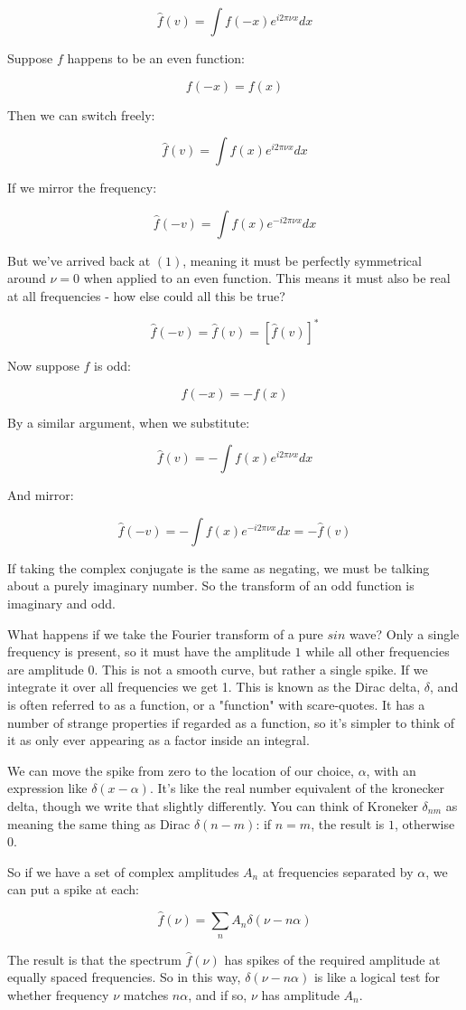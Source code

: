 $$\hat{f}(v) = \int f(-x)e^{i2\pi\nu x} dx$$

Suppose $f$ happens to be an even function:

$$f(-x) = f(x)$$

Then we can switch freely:

$$\hat{f}(v) = \int f(x)e^{i2\pi\nu x} dx$$

If we mirror the frequency:

$$\hat{f}(-v) = \int f(x)e^{-i2\pi\nu x} dx$$

But we've arrived back at $(1)$, meaning it must be perfectly symmetrical around $\nu = 0$ when applied to an even function. This means it must also be real at all frequencies - how else could all this be true?

$$
\hat{f}(-v) = \hat{f}(v) = \left[ \hat{f}(v) \right]^*
$$

Now suppose $f$ is odd:

$$f(-x) = -f(x)$$

By a similar argument, when we substitute:

$$
\hat{f}(v) = - \int f(x)e^{i2\pi\nu x}
dx
$$

And mirror:

$$
\hat{f}(-v) = - \int f(x)e^{-i2\pi\nu x}
dx
= -\hat{f}(v)
$$

If taking the complex conjugate is the same as negating, we must be talking about a purely imaginary number. So the transform of an odd function is imaginary and odd.

What happens if we take the Fourier transform of a pure $sin$ wave? Only a single frequency is present, so it must have the amplitude $1$ while all other frequencies are amplitude $0$. This is not a smooth curve, but rather a single spike. If we integrate it over all frequencies we get 1. This is known as the Dirac delta, $\delta$, and is often referred to as a function, or a "function" with scare-quotes. It has a number of strange properties if regarded as a function, so it's simpler to think of it as only ever appearing as a factor inside an integral.

We can move the spike from zero to the location of our choice, $\alpha$, with an expression like $\delta(x - \alpha)$. It's like the real number equivalent of the kronecker delta, though we write that slightly differently. You can think of Kroneker $\delta_{nm}$ as meaning the same thing as Dirac $\delta(n - m)$: if $n = m$, the result is $1$, otherwise $0$.

So if we have a set of complex amplitudes $A_n$ at frequencies separated by $\alpha$, we can put a spike at each:

$$
\hat{f}(\nu) =
\sum_n A_n \delta(\nu - n\alpha)
$$

The result is that the spectrum $\hat{f}(\nu)$ has spikes of the required amplitude at equally spaced frequencies. So in this way, $\delta(\nu - n\alpha)$ is like a logical test for whether frequency $\nu$ matches $n\alpha$, and if so, $\nu$ has amplitude $A_n$.
